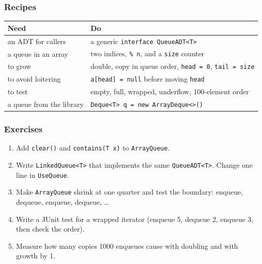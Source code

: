 \documentclass[aspectratio=169,10pt,compress]{beamer}
\begin{document}




\begin{frame}[t,fragile] \frametitle{Recipes}
  \begin{center}\small
  \begin{tabular}{@{}L{0.28\textwidth}L{0.62\textwidth}@{}}
    \toprule
    \textbf{Need} & \textbf{Do} \\
    \midrule
    an ADT for callers      & a generic \texttt{interface QueueADT<T>} \\
    a queue in an array     & two indices, \texttt{\% n}, and a \texttt{size} counter \\
    to grow                 & double, copy in queue order, \texttt{head = 0}, \texttt{tail = size} \\
    to avoid loitering      & \texttt{a[head] = null} before moving \texttt{head} \\
    to test                 & empty, full, wrapped, underflow, 100-element order \\
    a queue from the library& \texttt{Deque<T> q = new ArrayDeque<>()} \\
    \bottomrule
  \end{tabular}
  \end{center}
\end{frame}




\begin{frame}[t,fragile] \frametitle{Exercises}
  \begin{enumerate}\small
    \item Add \texttt{clear()} and \texttt{contains(T x)} to \texttt{ArrayQueue}.
    \item Write \texttt{LinkedQueue<T>} that implements the same \texttt{QueueADT<T>}. Change one line in \texttt{UseQueue}.
    \item Make \texttt{ArrayQueue} shrink at one quarter and test the boundary: enqueue, dequeue, enqueue, dequeue, \dots
    \item Write a JUnit test for a wrapped iterator (enqueue 5, dequeue 2, enqueue 3, then check the order).
    \item Measure how many copies 1000 enqueues cause with doubling and with growth by 1.
  \end{enumerate}
\end{frame}




\begin{frame}[t,fragile]
	\begin{center}
		\vspace{4cm}
	\end{center}
\end{frame}
\end{document}
